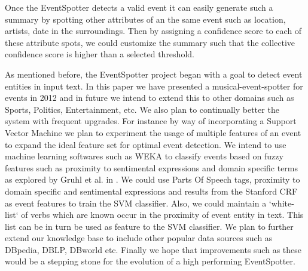 \documentclass[a4paper,11pt]{report}
\begin{document}
Once the EventSpotter detects a valid event it can easily generate such a summary by spotting other attributes of an the same event such as location, artists, date in the surroundings. Then by assigning a confidence score to each of these attribute spots, we could customize the summary such that the collective confidence score is higher than a selected threshold.

As mentioned before, the EventSpotter project began with a goal to detect event entities in input text. In this paper we have presented a musical-event-spotter for events in 2012 and in future we intend to extend this to other domains such as Sports, Politics, Entertainment, etc. We also plan to continually better the system with frequent upgrades. For instance by way of incorporating a Support Vector Machine we plan to experiment the usage of multiple features of an event to expand the ideal feature set for optimal event detection. We intend to use machine learning softwares such as WEKA to classify events based on fuzzy features such as proximity to sentimental expressions and domain specific terms as explored by Gruhl et al. in \cite{Gruhl_contextand}. We could use Parts Of Speech tags, proximity to domain specific and sentimental expressions and results from the Stanford CRF as event features to train the SVM classifier. Also, we could maintain a `white-list` of verbs which are known occur in the proximity of event entity in text. This list can be in turn be used as feature to the SVM classifier. We plan to further extend our knowledge base to include other popular data sources such as DBpedia, DBLP, DBworld etc. Finally we hope that improvements such as these would be a stepping stone for the evolution of a high performing EventSpotter.

{}
\end{document}

